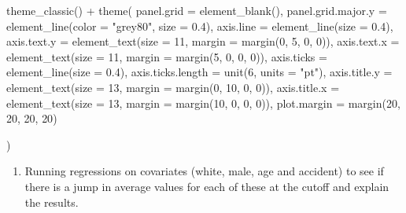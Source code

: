 \documentclass[
  11pt,
]{article}
\newenvironment{Shaded}{\begin{snugshade}}{\end{snugshade}}
\newcommand{\AttributeTok}[1]{\textcolor[rgb]{0.77,0.63,0.00}{#1}}
\newcommand{\DecValTok}[1]{\textcolor[rgb]{0.00,0.00,0.81}{#1}}
\newcommand{\FloatTok}[1]{\textcolor[rgb]{0.00,0.00,0.81}{#1}}
\newcommand{\FunctionTok}[1]{\textcolor[rgb]{0.00,0.00,0.00}{#1}}
\newcommand{\NormalTok}[1]{#1}
\newcommand{\SpecialCharTok}[1]{\textcolor[rgb]{0.00,0.00,0.00}{#1}}
\newcommand{\StringTok}[1]{\textcolor[rgb]{0.31,0.60,0.02}{#1}}
\providecommand{\tightlist}{%
  \setlength{\itemsep}{0pt}\setlength{\parskip}{0pt}}
\begin{document}
\begin{Shaded}
\begin{Highlighting}[]
  \FunctionTok{theme\_classic}\NormalTok{() }\SpecialCharTok{+}
  \FunctionTok{theme}\NormalTok{(}
    \AttributeTok{panel.grid =} \FunctionTok{element\_blank}\NormalTok{(),}
    \AttributeTok{panel.grid.major.y =} \FunctionTok{element\_line}\NormalTok{(}\AttributeTok{color =} \StringTok{"grey80"}\NormalTok{, }\AttributeTok{size =} \FloatTok{0.4}\NormalTok{),}
    \AttributeTok{axis.line =} \FunctionTok{element\_line}\NormalTok{(}\AttributeTok{size =} \FloatTok{0.4}\NormalTok{),}
    \AttributeTok{axis.text.y =} \FunctionTok{element\_text}\NormalTok{(}\AttributeTok{size =} \DecValTok{11}\NormalTok{, }\AttributeTok{margin =} \FunctionTok{margin}\NormalTok{(}\DecValTok{0}\NormalTok{, }\DecValTok{5}\NormalTok{, }\DecValTok{0}\NormalTok{, }\DecValTok{0}\NormalTok{)),}
    \AttributeTok{axis.text.x =} \FunctionTok{element\_text}\NormalTok{(}\AttributeTok{size =} \DecValTok{11}\NormalTok{, }\AttributeTok{margin =} \FunctionTok{margin}\NormalTok{(}\DecValTok{5}\NormalTok{, }\DecValTok{0}\NormalTok{, }\DecValTok{0}\NormalTok{, }\DecValTok{0}\NormalTok{)),}
    \AttributeTok{axis.ticks =} \FunctionTok{element\_line}\NormalTok{(}\AttributeTok{size =} \FloatTok{0.4}\NormalTok{),}
    \AttributeTok{axis.ticks.length =} \FunctionTok{unit}\NormalTok{(}\DecValTok{6}\NormalTok{, }\AttributeTok{units =} \StringTok{"pt"}\NormalTok{),}
    \AttributeTok{axis.title.y =} \FunctionTok{element\_text}\NormalTok{(}\AttributeTok{size =} \DecValTok{13}\NormalTok{, }\AttributeTok{margin =} \FunctionTok{margin}\NormalTok{(}\DecValTok{0}\NormalTok{, }\DecValTok{10}\NormalTok{, }\DecValTok{0}\NormalTok{, }\DecValTok{0}\NormalTok{)),}
    \AttributeTok{axis.title.x =} \FunctionTok{element\_text}\NormalTok{(}\AttributeTok{size =} \DecValTok{13}\NormalTok{, }\AttributeTok{margin =} \FunctionTok{margin}\NormalTok{(}\DecValTok{10}\NormalTok{, }\DecValTok{0}\NormalTok{, }\DecValTok{0}\NormalTok{, }\DecValTok{0}\NormalTok{)),}
    \AttributeTok{plot.margin =} \FunctionTok{margin}\NormalTok{(}\DecValTok{20}\NormalTok{, }\DecValTok{20}\NormalTok{, }\DecValTok{20}\NormalTok{, }\DecValTok{20}\NormalTok{)}
    
\NormalTok{  )}
\end{Highlighting}
\end{Shaded}

\begin{enumerate}
\def\labelenumi{\arabic{enumi}.}
\setcounter{enumi}{1}
\tightlist
\item
  Running regressions on covariates (white, male, age and accident) to
  see if there is a jump in average values for each of these at the
  cutoff and explain the results.
\end{enumerate}
\end{document}
